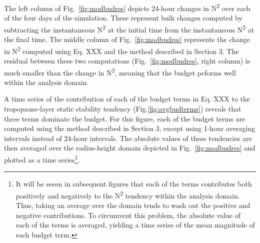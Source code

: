 \documentclass{ametsoc}
\begin{document}
The left column of Fig.~\ref{fig:modbudres} depicts 24-hour changes in N\textsuperscript{2} over each of the four days of the simulation. 
These represent bulk changes computed by subtracting the instantaneous N\textsuperscript{2} at the initial time from the instantaneous N\textsuperscript{2} at the final time. 
The middle column of Fig.~\ref{fig:modbudres} represents the change in N\textsuperscript{2} computed using Eq. XXX and the method described in Section 3. 
The residual between these two computations (Fig.~\ref{fig:modbudres}, right column) is much smaller than the change in N\textsuperscript{2}, meaning that the budget peforms well within the analysis domain.

A time series of the contribution of each of the budget terms in Eq. XXX to the tropopause-layer static stability tendency (Fig.\ref{fig:avgbudterms}) reveals that three terms dominate the budget.
For this figure, each of the budget terms are computed using the method described in Section 3, except using 1-hour averaging intervals instead of 24-hour intervals.
The absolute values of these tendencies are then averaged over the radius-height domain depicted in Fig.~\ref{fig:modbudres} and plotted as a time series\footnote{It will be seeen in subsequent figures that each of the terms contributes both positively and negatively to the N\textsuperscript{2} tendency within the analysis domain. 
Thus, taking an average over the domain tends to wash out the positive and negative contributions.
To circumvent this problem, the absolute value of each of the terms is averaged, yielding a time series of the mean magnitude of each budget term.}.




\end{document}
